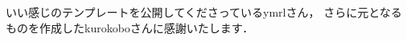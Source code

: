 \begin{acknowledgement}
  いい感じのテンプレートを公開してくださっているymrlさん，
  さらに元となるものを作成したkurokoboさんに感謝いたします．
\end{acknowledgement}
